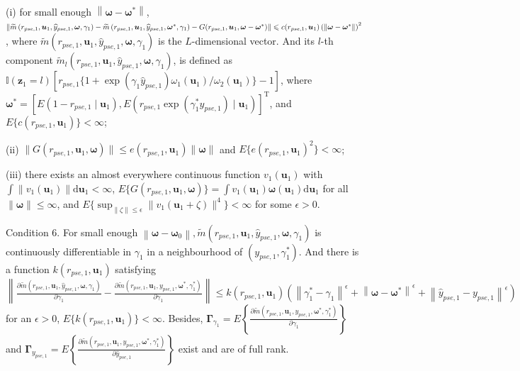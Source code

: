 \documentclass[12pt]{article}
\begin{document}
(i) for small enough $\left\|\bm{\omega}-\bm{\omega}^*\right\|$, $\| \widetilde{m}\left(r_{pse,1}, \bm{u}_1, \widehat{y}_{pse,1}, \bm{\omega}, \gamma_1\right)-\widetilde{m}\left(r_{pse,1}, \bm{u}_1, \widehat{y}_{pse,1}, \bm{\omega}^*, \gamma_1\right)-G(r_{pse,1},\\ \bm{u}_1, \bm{\omega}-\bm{\omega}^*) \| \leqslant c(r_{pse,1}, \bm{u}_1)\left(\left\|\bm{\omega}-\bm{\omega}^*\right\|\right)^2$, where $\widetilde{m}(r_{pse,1}, \bm{u}_1, \widehat{y}_{pse,1}, \bm{\omega}, \gamma_1)$ is the $L$-dimensional vector. And its $l$-th component $\widetilde{m}_l(r_{pse,1}, \bm{u}_1, \widehat{y}_{pse,1}, \bm{\omega}, \gamma_1)$, is defined as $\mathbb{I}(\bm{z}_1=l)[r_{pse,1}\{1+\exp (\gamma_1 \widehat{y}_{pse,1}) \omega_1(\bm{u}_1) / \omega_2(\bm{u}_1)\}-1]$, where $\bm{\omega}^* = [E(1-r_{pse,1} \mid \bm{u}_1), E(r_{pse,1} \exp (\gamma_1^* y_{pse,1}) \mid \bm{u}_1)]^{\mathrm{T}}$, and $E\{c(r_{pse,1}, \bm{u}_1)\}<\infty$;

(ii) $\|G(r_{pse,1}, \bm{u}_1, \bm{\omega})\| \leqslant e(r_{pse,1}, \bm{u}_1)\| \bm{\omega}\|$ and $E\{e(r_{pse,1}, \bm{u}_1)^2\}<\infty$;

(iii) there exists an almost everywhere continuous function $v_1(\bm{u}_1)$ with $\int\|v_1(\bm{u}_1)\| \mathrm{d} \bm{u}_1<\infty$, $E\{G(r_{pse,1}, \bm{u}_1, \bm{\omega})\}=\int v_1(\bm{u}_1) \bm{\omega}(\bm{u}_1) \mathrm{d} \bm{u}_1$ for all $\|\bm{\omega}\| \leqslant \infty$, and $E\{\sup _{\|\zeta\| \leqslant \epsilon}\|v_1(\bm{u}_1+\zeta)\|^4\}<\infty$ for some $\epsilon>0$.

Condition 6. For small enough $\left\|\bm{\omega}-\bm{\omega}_0\right\|, \widetilde{m}(r_{pse,1}, \bm{u}_1, \widehat{y}_{pse,1}, \bm{\omega}, \gamma_1)$ is continuously differentiable in $\gamma_1$ in a neighbourhood of $(y_{pse,1},\gamma_{1}^*)$. And there is a function $k(r_{pse,1}, \bm{u}_1)$ satisfying $\left\| \frac{\partial \widetilde{m}(r_{pse,1}, \bm{u}_1, \widehat{y}_{pse,1}, \bm{\omega}, \gamma_1)}{\partial \gamma_1}- \frac{\partial \widetilde{m}\left(r_{pse,1}, \bm{u}_1, y_{pse,1}, \bm{\omega}^*, \gamma_{1}^*\right)}{\partial \gamma_1}\right\| \leq k(r_{pse,1}, \bm{u}_1)(\left\|\gamma_{1}^*-\gamma_1\right\|^\epsilon+\left\|\bm{\omega}-\bm{\omega}^*\right\|^\epsilon+\left\|\widehat{y}_{pse,1}-y_{pse,1}\right\|^\epsilon)$ for an $\epsilon>0$, $E\{k(r_{pse,1}, \bm{u}_1)\}<\infty$. Besides, $  \bm{\Gamma}_{\gamma_1} = E\left\{\frac{\partial \widetilde{m}\left(r_{pse,1}, \bm{u}_1, y_{pse,1}, \bm{\omega}^*, \gamma_{1}^*\right)}{\partial \gamma_1}\right\}$ and $\bm{\Gamma}_{y_{pse,1}} = E\left\{\frac{\partial \widetilde{m}\left(r_{pse,1}, \bm{u}_1, y_{pse,1}, \bm{\omega}^*, \gamma_{1}^*\right)}{\partial \widehat{y}_{pse,1}}\right\}$ exist and are of full rank.
\end{document}
